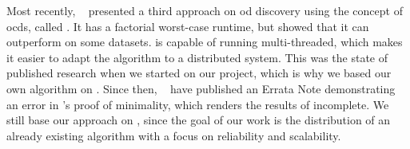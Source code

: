 Most recently, \citeauthor{consonni}~\cite{consonni} presented a third approach on \gls{od} discovery using the concept of \glspl{ocd}, called \ocddiscover{}.
It has a factorial worst-case runtime, but \citeauthor{consonni} showed that it can outperform \fastod{} on some datasets.
\ocddiscover{} is capable of running multi-threaded, which makes it easier to adapt the algorithm to a distributed system.
This was the state of published research when we started on our project, which is why we based our own algorithm on \ocddiscover{}.
Since then, \citeauthor{szlichta:errata}~\cite{szlichta:errata} have published an Errata Note demonstrating an error in \citeauthor{consonni}'s proof of minimality, which renders the results of \ocddiscover{} incomplete.
We still base our approach on \ocddiscover{}, since the goal of our work is the distribution of an already existing algorithm with a focus on reliability and scalability.
